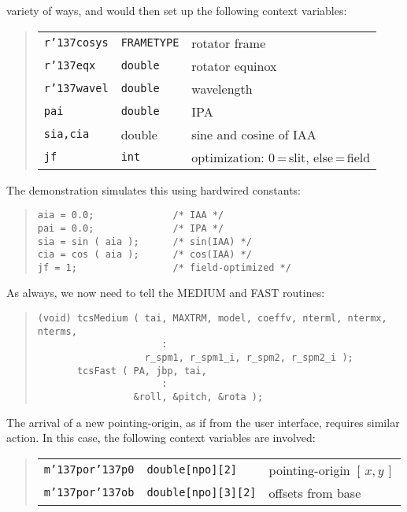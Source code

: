 \documentclass[12pt,fleqn,twoside]{article}
\renewcommand{\_}{{\tt\char'137}}     %
\newcommand{\xy}        {$[\,x,y\,]$}
\begin{document}
variety of ways, and would then set up the following context
variables:
\begin{quote}
\begin{tabular}{lll}
{\tt r\_cosys} & {{\tt FRAMETYPE}} & {rotator frame} \\
{\tt r\_eqx} & {\tt double} & {rotator equinox} \\
{\tt r\_wavel} & {\tt double} & {wavelength} \\
{\tt pai} & {\tt double} & {IPA} \\
{\tt sia,cia} & {double} & {sine and cosine of IAA} \\
{\tt jf} & {\tt int} & {optimization: 0\,=\,slit, else\,=\,field} \\
\end{tabular}
\end{quote}
The demonstration simulates this using hardwired constants:
\begin{quote}
\begin{small}
\begin{verbatim}
aia = 0.0;              /* IAA */
pai = 0.0;              /* IPA */
sia = sin ( aia );      /* sin(IAA) */
cia = cos ( aia );      /* cos(IAA) */
jf = 1;                 /* field-optimized */
\end{verbatim}\end{small}
\end{quote}
As always, we now need to tell the MEDIUM and FAST routines:
\begin{quote}
\begin{small}
\begin{verbatim}
(void) tcsMedium ( tai, MAXTRM, model, coeffv, nterml, ntermx, nterms,
                      :
                   r_spm1, r_spm1_i, r_spm2, r_spm2_i );
       tcsFast ( PA, jbp, tai,
                      :
                 &roll, &pitch, &rota );
\end{verbatim}\end{small}
\end{quote}
The arrival of a new pointing-origin, as if from the user interface,
requires similar action.  In this case, the following
context variables are involved:
\begin{quote}
\begin{tabular}{lll}
{\tt m\_por\_p0} & {\tt double[npo][2]} & {pointing-origin \xy} \\
{\tt m\_por\_ob} & {\tt double[npo][3][2]} & {offsets from base} \\
\end{tabular}
\end{quote}
\end{document}

